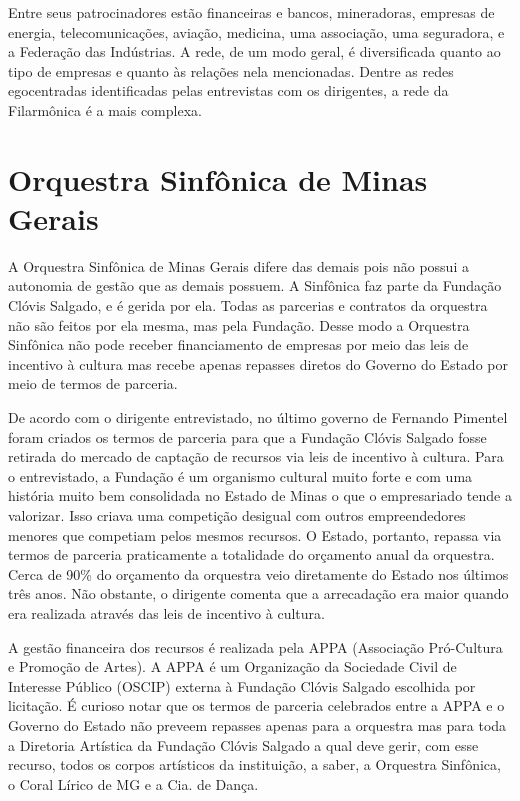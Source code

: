 \documentclass[a4paper, 12pt, openright, oneside, german, french, english, brazil]{abntex2}
\begin{document}
	Entre seus patrocinadores estão financeiras e bancos, mineradoras, empresas de energia, telecomunicações, aviação, medicina, uma associação, uma seguradora, e a Federação das Indústrias. A rede, de um modo geral, é diversificada quanto ao tipo de empresas e quanto às relações nela mencionadas. Dentre as redes egocentradas identificadas pelas entrevistas com os dirigentes, a rede da Filarmônica é a mais complexa.
	


	\section{Orquestra Sinfônica de Minas Gerais}

	A Orquestra Sinfônica de Minas Gerais difere das demais pois não possui a autonomia de gestão que as demais possuem. A Sinfônica faz parte da Fundação Clóvis Salgado, e é gerida por ela. Todas as parcerias e contratos da orquestra não são feitos por ela mesma, mas pela Fundação. Desse modo a Orquestra Sinfônica não pode receber financiamento de empresas por meio das leis de incentivo à cultura mas recebe apenas repasses diretos do Governo do Estado por meio de termos de parceria.
	
	De acordo com o dirigente entrevistado, no último governo de Fernando Pimentel foram criados os termos de parceria para que a Fundação Clóvis Salgado fosse retirada do mercado de captação de recursos via leis de incentivo à cultura. Para o entrevistado, a Fundação é um organismo cultural muito forte e com uma história muito bem consolidada no Estado de Minas o que o empresariado tende a valorizar. Isso criava uma competição desigual com outros empreendedores menores que competiam pelos mesmos recursos. O Estado, portanto, repassa via termos de parceria praticamente a totalidade do orçamento anual da orquestra. Cerca de 90\% do orçamento da orquestra veio diretamente do Estado nos últimos três anos. Não obstante, o dirigente comenta que a arrecadação era maior quando era realizada através das leis de incentivo à cultura.
	
	A gestão financeira dos recursos é realizada pela APPA (Associação Pró-Cultura e Promoção de Artes). A APPA é um Organização da Sociedade Civil de Interesse Público (OSCIP) externa à Fundação Clóvis Salgado escolhida por licitação. É curioso notar que os termos de parceria celebrados entre a APPA e o Governo do Estado não preveem repasses apenas para a orquestra mas para toda a Diretoria Artística da Fundação Clóvis Salgado a qual deve gerir, com esse recurso, todos os corpos artísticos da instituição, a saber, a Orquestra Sinfônica, o Coral Lírico de MG e a Cia. de Dança.
	
\end{document}
